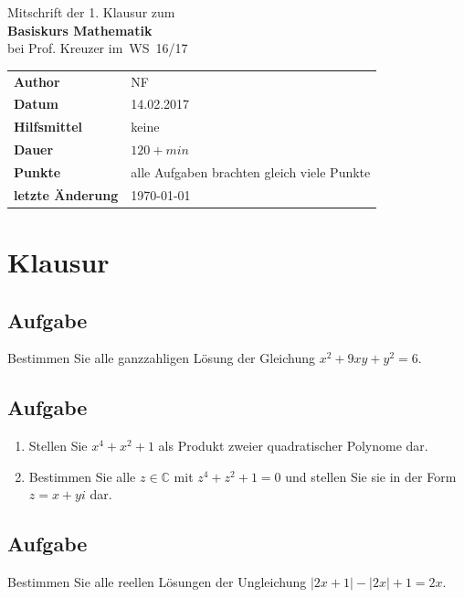 \documentclass[a4paper,10pt]{article}
\begin{document}
\begin{center}
	\huge Mitschrift der 1. Klausur zum \\
	\Huge \textbf{Basiskurs Mathematik} \\
	\huge bei Prof. Kreuzer im WS 16/17 \\
	\normalsize

	\vspace{.5cm}
	\begin{tabular}[b]{l|l}
		\textbf{Author} & NF \\ %
		\textbf{Datum} & 14.02.2017 \\
		\textbf{Hilfsmittel} & keine \\
		\textbf{Dauer} & $120+ min$ \\
		\textbf{Punkte} & alle Aufgaben brachten gleich viele Punkte \\
		\textbf{letzte Änderung} & \today \\
	\end{tabular}

	\vspace{.5cm}
\end{center}

\renewcommand\thesection{}
\renewcommand\thesubsection{\arabic{subsection}.}

\section{Klausur}

\subsection{Aufgabe}
Bestimmen Sie alle ganzzahligen Lösung der Gleichung $x^2+9xy+y^2=6$.

\subsection{Aufgabe}
\begin{enumerate}[label=\alph*)]
\item Stellen Sie $x^4+x^2+1$ als Produkt zweier quadratischer Polynome dar.
\item Bestimmen Sie alle $z \in \mathbb{C}$ mit $z^4+z^2+1=0$ und stellen Sie sie in der Form $z = x + y i$ dar.
\end{enumerate}

\subsection{Aufgabe}
Bestimmen Sie alle reellen Lösungen der Ungleichung $|2x + 1| - |2x| + 1 = 2x$.
\end{document}

